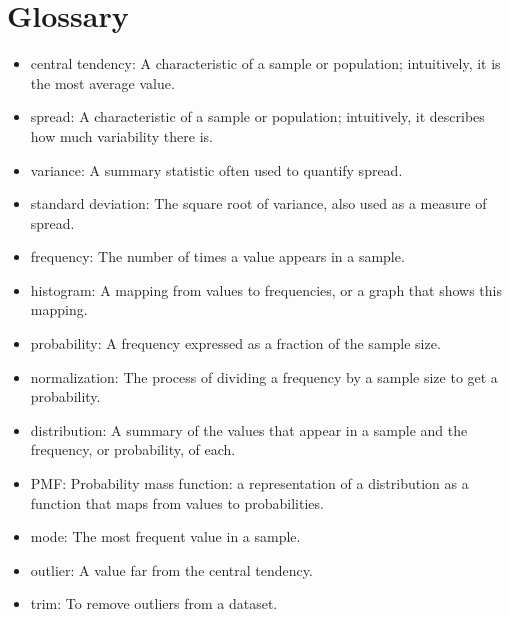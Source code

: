 \documentclass[12pt]{book}
\begin{document}
\section{Glossary}

\begin{itemize}

\item central tendency: A characteristic of a sample or population;
intuitively, it is the most average value. 

\item spread: A characteristic of a sample or population;
intuitively, it describes how much variability there is.

\item variance: A summary statistic often used to quantify spread.

\item standard deviation: The square root of variance, also used
as a measure of spread.

\item frequency: The number of times a value appears in a sample.

\item histogram: A mapping from values to frequencies, or a graph
that shows this mapping.

\item probability: A frequency expressed as a fraction of the sample
size.

\item normalization: The process of dividing a frequency by a sample
size to get a probability.

\item distribution: A summary of the values that appear in a sample
and the frequency, or probability, of each.

\item PMF: Probability mass function: a representation of a distribution
as a function that maps from values to probabilities.

\item mode: The most frequent value in a sample.

\item outlier: A value far from the central tendency.

\item trim: To remove outliers from a dataset.


\end{itemize}
\end{document}
